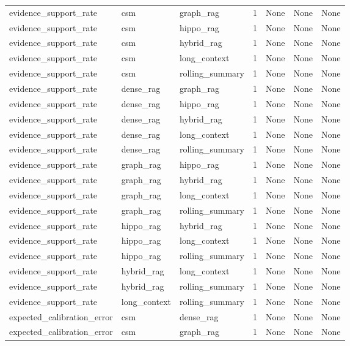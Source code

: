 \begin{tabular}{lllllll}
evidence\_support\_rate & csm & graph\_rag & 1 & None & None & None \\
evidence\_support\_rate & csm & hippo\_rag & 1 & None & None & None \\
evidence\_support\_rate & csm & hybrid\_rag & 1 & None & None & None \\
evidence\_support\_rate & csm & long\_context & 1 & None & None & None \\
evidence\_support\_rate & csm & rolling\_summary & 1 & None & None & None \\
evidence\_support\_rate & dense\_rag & graph\_rag & 1 & None & None & None \\
evidence\_support\_rate & dense\_rag & hippo\_rag & 1 & None & None & None \\
evidence\_support\_rate & dense\_rag & hybrid\_rag & 1 & None & None & None \\
evidence\_support\_rate & dense\_rag & long\_context & 1 & None & None & None \\
evidence\_support\_rate & dense\_rag & rolling\_summary & 1 & None & None & None \\
evidence\_support\_rate & graph\_rag & hippo\_rag & 1 & None & None & None \\
evidence\_support\_rate & graph\_rag & hybrid\_rag & 1 & None & None & None \\
evidence\_support\_rate & graph\_rag & long\_context & 1 & None & None & None \\
evidence\_support\_rate & graph\_rag & rolling\_summary & 1 & None & None & None \\
evidence\_support\_rate & hippo\_rag & hybrid\_rag & 1 & None & None & None \\
evidence\_support\_rate & hippo\_rag & long\_context & 1 & None & None & None \\
evidence\_support\_rate & hippo\_rag & rolling\_summary & 1 & None & None & None \\
evidence\_support\_rate & hybrid\_rag & long\_context & 1 & None & None & None \\
evidence\_support\_rate & hybrid\_rag & rolling\_summary & 1 & None & None & None \\
evidence\_support\_rate & long\_context & rolling\_summary & 1 & None & None & None \\
expected\_calibration\_error & csm & dense\_rag & 1 & None & None & None \\
expected\_calibration\_error & csm & graph\_rag & 1 & None & None & None \\

\end{tabular}
